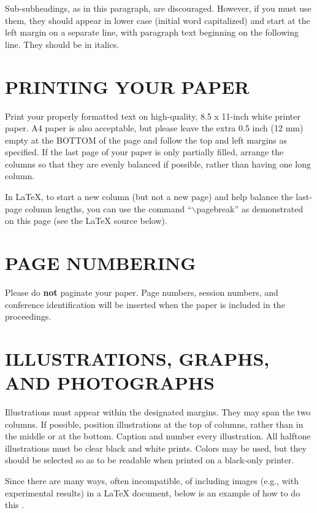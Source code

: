 \documentclass{article}
\begin{document}
Sub-subheadings, as in this paragraph, are discouraged. However, if you
must use them, they should appear in lower case (initial word
capitalized) and start at the left margin on a separate line, with paragraph
text beginning on the following line.  They should be in italics.

\section{PRINTING YOUR PAPER}
\label{sec:print}

Print your properly formatted text on high-quality, 8.5 x 11-inch white printer
paper. A4 paper is also acceptable, but please leave the extra 0.5 inch (12 mm)
empty at the BOTTOM of the page and follow the top and left margins as
specified.  If the last page of your paper is only partially filled, arrange
the columns so that they are evenly balanced if possible, rather than having
one long column.

In LaTeX, to start a new column (but not a new page) and help balance the
last-page column lengths, you can use the command ``$\backslash$pagebreak'' as
demonstrated on this page (see the LaTeX source below).

\section{PAGE NUMBERING}
\label{sec:page}

Please do {\bf not} paginate your paper.  Page numbers, session numbers, and
conference identification will be inserted when the paper is included in the
proceedings.

\section{ILLUSTRATIONS, GRAPHS, AND PHOTOGRAPHS}
\label{sec:illust}

Illustrations must appear within the designated margins.  They may span the two
columns.  If possible, position illustrations at the top of columns, rather
than in the middle or at the bottom.  Caption and number every illustration.
All halftone illustrations must be clear black and white prints.  Colors may be
used, but they should be selected so as to be readable when printed on a
black-only printer.

Since there are many ways, often incompatible, of including images (e.g., with
experimental results) in a LaTeX document, below is an example of how to do
this \cite{Lamp86}.
\end{document}
